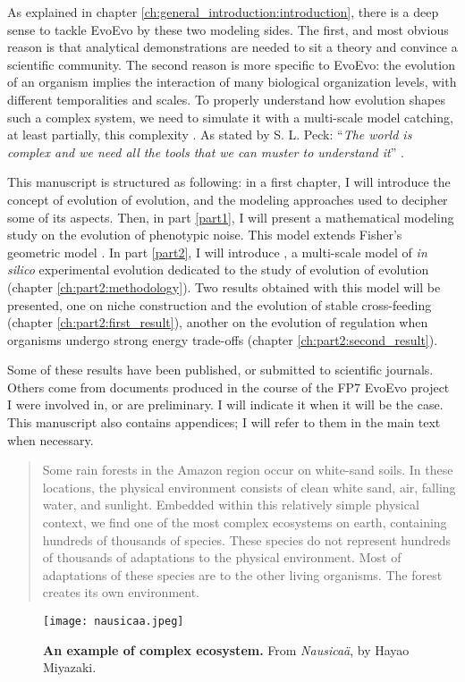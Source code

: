 As explained in chapter \ref{ch:general_introduction:introduction}, there is a deep sense to tackle EvoEvo by these two modeling sides. The first, and most obvious reason is that analytical demonstrations are needed to sit a theory and convince a scientific community. The second reason is more specific to EvoEvo: the evolution of an organism implies the interaction of many biological organization levels, with different temporalities and scales. To properly understand how evolution shapes such a complex system, we need to simulate it with a multi-scale model catching, at least partially, this complexity \citep{lavelle-et-al-2008}. As stated by S. L. Peck: ``\textit{The world is complex and we need all the tools that we can muster to understand it}'' \citep{peck-2004}.

This manuscript is structured as following: in a first chapter, I will introduce the concept of evolution of evolution, and the modeling approaches used to decipher some of its aspects. Then, in part \ref{part1}, I will present a mathematical modeling study on the evolution of phenotypic noise. This model extends Fisher's geometric model \citep{fisher-1930}. In part \ref{part2}, I will introduce {\EvoEvoSim}, a multi-scale model of \textit{in silico} experimental evolution \citep{hindre-et-al-2012} dedicated to the study of evolution of evolution (chapter \ref{ch:part2:methodology}). Two results obtained with this model will be presented, one on niche construction and the evolution of stable cross-feeding (chapter \ref{ch:part2:first_result}), another on the evolution of regulation when organisms undergo strong energy trade-offs (chapter \ref{ch:part2:second_result}).

Some of these results have been published, or submitted to scientific journals. Others come from documents produced in the course of the FP7 EvoEvo project I were involved in, or are preliminary. I will indicate it when it will be the case. This manuscript also contains appendices; I will refer to them in the main text when necessary.

\newpage

\begin{quote}
Some rain forests in the Amazon region occur on white-sand soils. In these locations, the physical environment consists of clean white sand, air, falling water, and sunlight. Embedded within this relatively simple physical context, we find one of the most complex ecosystems on earth, containing hundreds of thousands of species. These species do not represent hundreds of thousands of adaptations to the physical environment. Most of adaptations of these species are to the other living organisms. The forest creates its own environment. \citep{ray-1993}
\end{quote}

\begin{figure}[!h]
\centering
\texttt{[image: nausicaa.jpeg]}
\caption[An example of complex ecosystem.]{{\bf An example of complex ecosystem.} From \textit{Nausica\"a}, by Hayao Miyazaki.}
\label{fig:nausicaa}
\end{figure}

